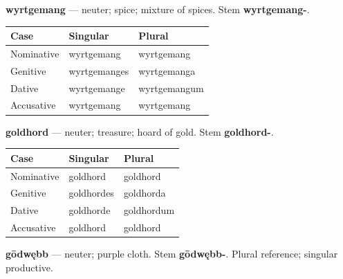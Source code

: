 \textbf{wyrtgemang} — neuter; spice; mixture of spices. Stem \textbf{wyrtgemang-}.

\par\begingroup
\fontsize{10.5}{13.2}\selectfont
\setlength{\LTleft}{0pt}\setlength{\LTright}{\fill}
\noindent
\begin{tabular}{@{}>{\raggedright\arraybackslash}p{34.82mm}>{\raggedright\arraybackslash}p{41.78mm}>{\raggedright\arraybackslash}p{41.78mm}@{}}
\toprule
\textbf{Case} & \textbf{Singular} & \textbf{Plural} \\
\midrule
Nominative & wyrtgemang & wyrtgemang \\
Genitive & wyrtgemanges & wyrtgemanga \\
Dative & wyrtgemange & wyrtgemangum \\
Accusative & wyrtgemang & wyrtgemang \\
\bottomrule
\end{tabular}
\par\endgroup

\textbf{goldhord} — neuter; treasure; hoard of gold. Stem \textbf{goldhord-}.

\par\begingroup
\fontsize{10.5}{13.2}\selectfont
\setlength{\LTleft}{0pt}\setlength{\LTright}{\fill}
\noindent
\begin{tabular}{@{}>{\raggedright\arraybackslash}p{39.46mm}>{\raggedright\arraybackslash}p{39.46mm}>{\raggedright\arraybackslash}p{39.46mm}@{}}
\toprule
\textbf{Case} & \textbf{Singular} & \textbf{Plural} \\
\midrule
Nominative & goldhord & goldhord \\
Genitive & goldhordes & goldhorda \\
Dative & goldhorde & goldhordum \\
Accusative & goldhord & goldhord \\
\bottomrule
\end{tabular}
\par\endgroup

\textbf{gōdwębb} — neuter; purple cloth. Stem \textbf{gōdwębb-}. Plural reference; singular productive.

